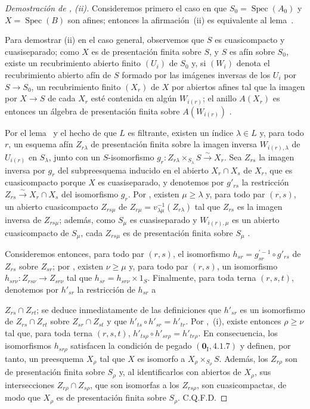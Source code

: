 \begin{proof}[Demostración de , (ii)]
Consideremos primero el caso en que $S_0=\operatorname{Spec}(A_0)$ y $X=\operatorname{Spec}(B)$ son afines; entonces la afirmación~(ii) es equivalente al lema~.

Para demostrar (ii) en el caso general, observemos que $S$ es cuasicompacto y cuasiseparado; como $X$ es de presentación finita sobre $S$, y $S$ es afín sobre $S_0$, existe un recubrimiento abierto finito $(U_i)$ de $S_0$ y, si $(W_i)$ denota el recubrimiento abierto afín de $S$ formado por las imágenes inversas de los $U_i$ por $S\to S_0$, un recubrimiento finito $(X_r)$ de $X$ por abiertos afines tal que la imagen por $X\to S$ de cada $X_r$ esté contenida en algún $W_{i(r)}$; el anillo $A(X_r)$ es entonces un álgebra de presentación finita sobre $A(W_{i(r)})$ .

Por el lema~ y el hecho de que $L$ es filtrante, existen un índice $\lambda\in L$ y, para todo $r$, un esquema afín $Z_{r\lambda}$ de presentación finita sobre la imagen inversa $W_{i(r),\lambda}$ de $U_{i(r)}$ en $S_\lambda$, junto con un $S$-isomorfismo
$g_r:Z_{r\lambda}\times_{S_\lambda}S\xrightarrow{\sim}X_r$.
Sea $Z_{rs}$ la imagen inversa por $g_r$ del subpreesquema inducido en el abierto $X_r\cap X_s$ de $X_r$, que es cuasicompacto porque $X$ es cuasiseparado, y denotemos por $g'_{rs}$ la restricción $Z_{rs}\xrightarrow{\sim}X_r\cap X_s$ del isomorfismo $g_r$. Por , existen $\mu\geq\lambda$ y, para todo par $(r,s)$, un abierto cuasicompacto $Z_{rs\mu}$ de $Z_{r\mu}=v_{\lambda\mu}^{-1}(Z_{r\lambda})$ tal que $Z_{rs}$ es la imagen inversa de $Z_{rs\mu}$; además, como $S_\mu$ es cuasiseparado y $W_{i(r),\mu}$ es un abierto cuasicompacto de $S_\mu$, cada $Z_{rs\mu}$ es de presentación finita sobre $S_\mu$ .

Consideremos entonces, para todo par $(r,s)$, el isomorfismo $h_{sr}=g_{sr}^{'-1}\circ g'_{rs}$ de $Z_{rs}$ sobre $Z_{sr}$; por , existen $\nu\geq\mu$ y, para todo par $(r,s)$, un isomorfismo
$h_{sr\nu}:Z_{rs\nu}\to Z_{sr\nu}$
tal que $h_{sr}=h_{sr\nu}\times1_S$. Finalmente, para toda terna $(r,s,t)$, denotemos por $h'_{sr}$ la restricción de $h_{sr}$ a


$Z_{rs}\cap Z_{rt}$; se deduce inmediatamente de las definiciones que $h'_{sr}$ es un isomorfismo de $Z_{rs}\cap Z_{rt}$ sobre $Z_{sr}\cap Z_{st}$ y que
$h'_{ts}\circ h'_{sr}=h'_{tr}$.
Por ,~(i), existe entonces $\rho\geq\nu$ tal que, para toda terna $(r,s,t)$,
$h'_{ts\rho}\circ h'_{sr\rho}=h'_{tr\rho}$.
En consecuencia, los isomorfismos $h_{sr\rho}$ satisfacen la condición de pegado $(\mathbf{0}_{\mathrm I}, 4.1.7)$ y definen, por tanto, un preesquema $X_\rho$ tal que $X$ es isomorfo a $X_\rho\times_{S_\rho}S$. Además, los $Z_{r\rho}$ son de presentación finita sobre $S_\rho$ y, al identificarlos con abiertos de $X_\rho$, sus intersecciones $Z_{r\rho}\cap Z_{s\rho}$, que son isomorfas a los $Z_{rs\rho}$, son cuasicompactas, de modo que  $X_\rho$ es de presentación finita sobre $S_\rho$. C.Q.F.D.
\end{proof}

